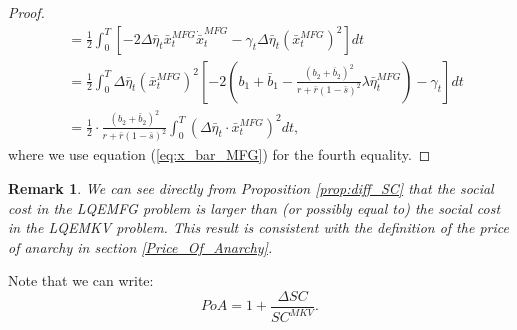 \documentclass[11pt]{article}
\newtheorem{remark}{Remark}
\begin{document}
\begin{proof}
\begin{equation*}
\begin{split}
			&= \frac{1}{2}\int_0^T \left[- 2\Delta{\bar{\eta}}_t \bar{x}_t^{MFG} \dot{\bar{x}}_t^{MFG} - \gamma_t \Delta{\bar{\eta}}_t (\bar{x}_t^{MFG})^2 \right]dt \\
			&= \frac{1}{2} \int_0^T \Delta{\bar{\eta}}_t (\bar{x}_t^{MFG})^2 \left[-2\left(b_1 + \bar{b}_1 - \frac{(b_2+\bar{b}_2)^2}{r + \bar{r}(1-\bar{s})^2} \lambda \bar{\eta}_t^{MFG}\right) - \gamma_t\right] dt\\
			&= \frac{1}{2}\cdot \frac{(b_2 + \bar{b}_2)^2}{r + \bar{r}(1-\bar{s})^2} \int_0^T (\Delta \bar{\eta}_t \cdot \bar{x}_t^{MFG})^2 dt,
		\end{split}
	\end{equation*}
	where we use equation (\ref{eq:x_bar_MFG}) for the fourth equality.	
	
\end{proof}

\begin{remark}
	We can see directly from Proposition \ref{prop:diff_SC} that the social cost in the LQEMFG problem is larger than (or possibly equal to) the social cost in the LQEMKV problem. This result is consistent with the definition of the price of anarchy in section \ref{Price_Of_Anarchy}.
\end{remark}

Note that we can write:
\begin{equation}
PoA =1+ \frac{\Delta SC}{SC^{MKV}}.
\label{eq:PoA_LQ}
\end{equation}
\end{document}
